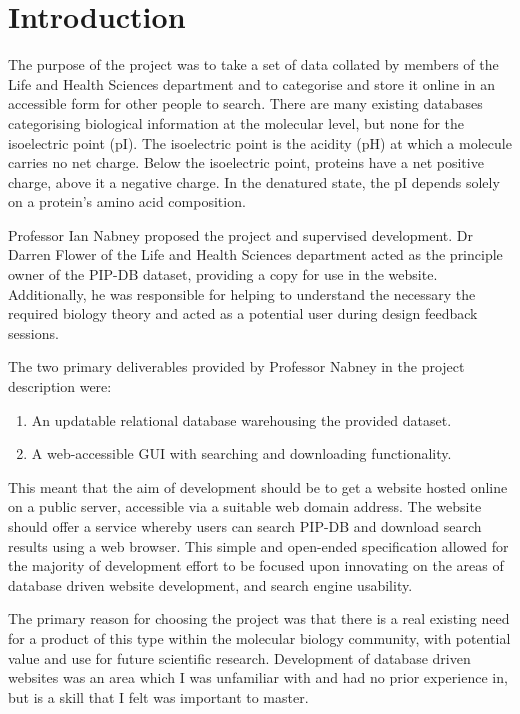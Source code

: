 \chapter{Introduction}\label{chap:introduction}

The purpose of the project was to take a set of data collated by
members of the Life and Health Sciences department and to categorise
and store it online in an accessible form for other people to
search. There are many existing databases categorising biological
information at the molecular level, but none for the isoelectric point
(pI). The isoelectric point is the acidity (pH) at which a molecule
carries no net charge. Below the isoelectric point, proteins have a
net positive charge, above it a negative charge. In the denatured
state, the pI depends solely on a protein’s amino acid composition.

Professor Ian Nabney proposed the project and supervised
development. Dr Darren Flower of the Life and Health Sciences
department acted as the principle owner of the PIP-DB dataset,
providing a copy for use in the website. Additionally, he was
responsible for helping to understand the necessary the required
biology theory and acted as a potential user during design feedback
sessions.

The two primary deliverables provided by Professor Nabney in the
project description were:

\begin{enumerate}
\item An updatable relational database warehousing the provided dataset.
\item A web-accessible GUI with searching and downloading functionality.
\end{enumerate}

This meant that the aim of development should be to get a website
hosted online on a public server, accessible via a suitable web domain
address. The website should offer a service whereby users can search
PIP-DB and download search results using a web browser. This simple
and open-ended specification allowed for the majority of development
effort to be focused upon innovating on the areas of database driven
website development, and search engine usability.

The primary reason for choosing the project was that there is a real
existing need for a product of this type within the molecular biology
community, with potential value and use for future scientific
research. Development of database driven websites was an area which I
was unfamiliar with and had no prior experience in, but is a skill
that I felt was important to master.

